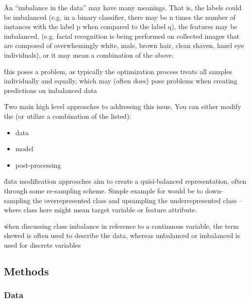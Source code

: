 


\r{An ``imbalance in the data'' may have many meanings. That is, the labels could be imbalanced (e.g. in a binary classifier, there may be n times the number of instances with the label p when compared to the label q), the features may be imbalanced, (e.g. facial recognition is being performed on collected images that are composed of overwhemingly white, male, brown hair, clean shaven, hazel eye individuals), or it may mean a combination of the above.}

\r{this poses a problem, as typically the optimization process treats all samples individually and equally, which may (often does) pose problems when creating predictions on imbalanced data}

\r{Two main high level approaches to addressing this issue. You can either modify the (or utilize a combination of the listed):}
\begin{itemize}[noitemsep,topsep=0pt]
	\item data
	\item model
	\item post-processing
\end{itemize}

\r{data modification approaches aim to create a quisi-balanced representation, often through some re-sampling scheme. Simple example for would be to down-sampling the overrepresented class and upsampling the underrepresented class -- where class here might mean target variable or feature attribute.}

\r{when discussing class imbalance in reference to a continuous variable, the term skewed is often used to describe the data, whereas unbalanced or imbalanced is used for discrete variables}


\subsection{Methods}


\subsubsection{Data}

